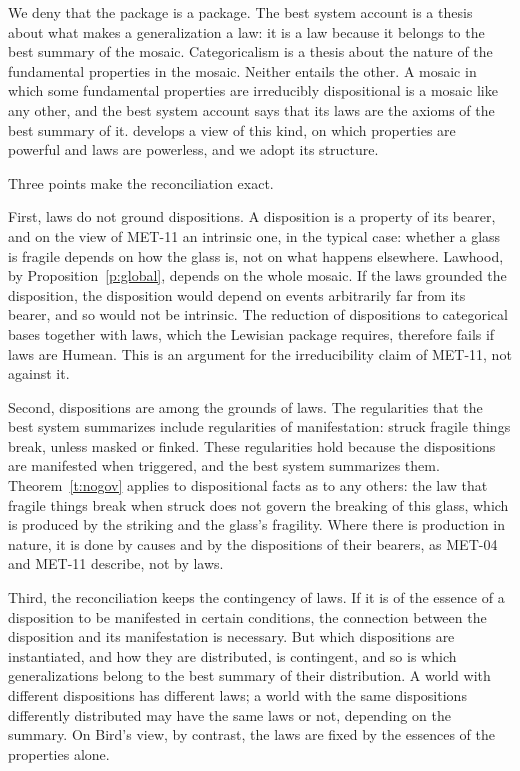 \documentclass{situationist-preprint}
\begin{document}
We deny that the package is a package. The best system account is a thesis about what makes a generalization a law: it is a law because it belongs to the best summary of the mosaic. Categoricalism is a thesis about the nature of the fundamental properties in the mosaic. Neither entails the other. A mosaic in which some fundamental properties are irreducibly dispositional is a mosaic like any other, and the best system account says that its laws are the axioms of the best summary of it. \citet{Demarest2017} develops a view of this kind, on which properties are powerful and laws are powerless, and we adopt its structure.

Three points make the reconciliation exact.

First, laws do not ground dispositions. A disposition is a property of its bearer, and on the view of MET-11 an intrinsic one, in the typical case: whether a glass is fragile depends on how the glass is, not on what happens elsewhere. Lawhood, by Proposition~\ref{p:global}, depends on the whole mosaic. If the laws grounded the disposition, the disposition would depend on events arbitrarily far from its bearer, and so would not be intrinsic. The reduction of dispositions to categorical bases together with laws, which the Lewisian package requires, therefore fails if laws are Humean. This is an argument for the irreducibility claim of MET-11, not against it.

Second, dispositions are among the grounds of laws. The regularities that the best system summarizes include regularities of manifestation: struck fragile things break, unless masked or finked. These regularities hold because the dispositions are manifested when triggered, and the best system summarizes them. Theorem~\ref{t:nogov} applies to dispositional facts as to any others: the law that fragile things break when struck does not govern the breaking of this glass, which is produced by the striking and the glass's fragility. Where there is production in nature, it is done by causes and by the dispositions of their bearers, as MET-04 and MET-11 describe, not by laws.

Third, the reconciliation keeps the contingency of laws. If it is of the essence of a disposition to be manifested in certain conditions, the connection between the disposition and its manifestation is necessary. But which dispositions are instantiated, and how they are distributed, is contingent, and so is which generalizations belong to the best summary of their distribution. A world with different dispositions has different laws; a world with the same dispositions differently distributed may have the same laws or not, depending on the summary. On Bird's view, by contrast, the laws are fixed by the essences of the properties alone.
\end{document}
